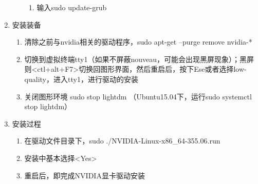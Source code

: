 \begin{enumerate}
\begin{itemize}
\begin{enumerate}
	    \item 输入sudo update-grub
	    \end{enumerate}	
	\end{itemize}
\item 安装装备
	\begin{enumerate}
	\item 清除之前与nvidia相关的驱动程序，sudo apt-get --purge remove nvidia-*  
	\item <ctl+alt+F1>切换到虚拟终端tty1（如果不屏蔽nouveau，可能会出现黑屏现象）；黑屏则<ctl+alt+F7>切换回图形界面，然后重启后，按下Ese或者选择low-quality，进入tty1，进行驱动的安装
	\item 关闭图形环境  sudo stop lightdm （Ubuntu15.04下，运行sudo systemctl stop lightdm）
	\end{enumerate}

\item 安装过程 
	\begin{enumerate}
	\item 在驱动文件目录下，sudo ./NVIDIA-Linux-x86\_64-355.06.run
	\item 安装中基本选择<Yes>
	\item 重启后，即完成NVIDIA显卡驱动安装
	\end{enumerate}
\end{enumerate}

